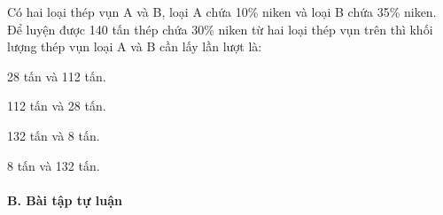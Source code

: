 \documentclass[%
    fontsize=12pt,%
    chapterprefix=false,%
    open=right,%
    twoside=false,%
    numbers=noenddot,%
    headings=optiontohead,%
    final,%
    DIV=15,%
    parskip=half %
]{scrbook}
\begin{document}
\begin{tracnghiem}
\item Có hai loại thép vụn A và B, loại A chứa 10\% niken và loại B chứa 35\% niken. Để luyện được 140 tấn thép chứa 30\% niken từ hai loại thép vụn trên thì khối lượng thép vụn loại A và B cần lấy lần lượt là:
\begin{options}
  \item 28 tấn và 112 tấn.
  \item 112 tấn và 28 tấn.
  \item 132 tấn và 8 tấn.
  \item 8 tấn và 132 tấn.
\end{options}

\end{tracnghiem}

\paragraph{B. Bài tập tự luận}
\end{document}
